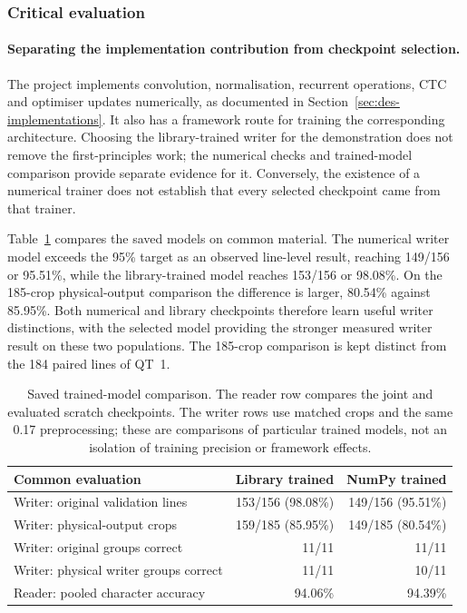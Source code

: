 \subsubsection{Critical evaluation}
\label{sec:dis-choices}
\paragraph{Separating the implementation contribution from checkpoint selection.}
The project implements convolution, normalisation, recurrent operations, CTC and optimiser updates numerically, as documented in Section~\ref{sec:des-implementations}. It also has a framework route for training the corresponding architecture. Choosing the library-trained writer for the demonstration does not remove the first-principles work; the numerical checks and trained-model comparison provide separate evidence for it. Conversely, the existence of a numerical trainer does not establish that every selected checkpoint came from that trainer.

Table~\ref{tab:dis-training} compares the saved models on common material. The numerical writer model exceeds the 95\% target as an observed line-level result, reaching 149/156 or 95.51\%, while the library-trained model reaches 153/156 or 98.08\%. On the 185-crop physical-output comparison the difference is larger, 80.54\% against 85.95\%. Both numerical and library checkpoints therefore learn useful writer distinctions, with the selected model providing the stronger measured writer result on these two populations. The 185-crop comparison is kept distinct from the 184 paired lines of QT~1.

\begin{table}[!htbp]\centering\small
\begin{tabular}{lrr}\toprule
\textbf{Common evaluation} & \textbf{Library trained} & \textbf{NumPy trained}\\\midrule
Writer: original validation lines & 153/156 (98.08\%) & 149/156 (95.51\%)\\
Writer: physical-output crops & 159/185 (85.95\%) & 149/185 (80.54\%)\\
Writer: original groups correct & 11/11 & 11/11\\
Writer: physical writer groups correct & 11/11 & 10/11\\
Reader: pooled character accuracy & 94.06\% & 94.39\%\\\bottomrule
\end{tabular}
\caption{Saved trained-model comparison. The reader row compares the joint and evaluated scratch checkpoints. The writer rows use matched crops and the same 0.17 preprocessing; these are comparisons of particular trained models, not an isolation of training precision or framework effects.}
\label{tab:dis-training}\end{table}

